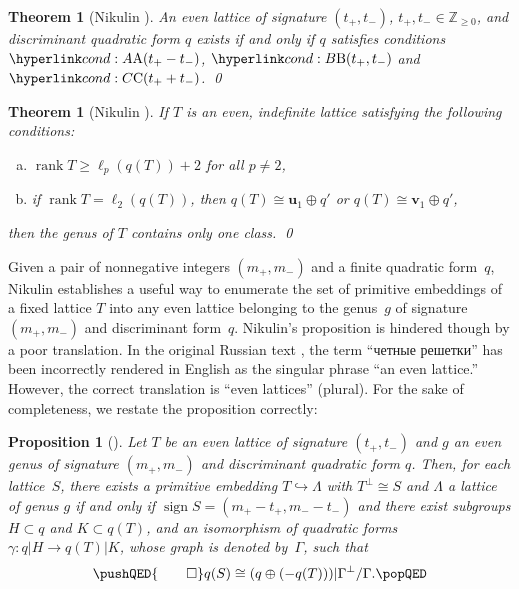 \documentclass[a4paper]{amsart}
\theoremstyle{definition}
\theoremstyle{plain}
\newtheorem{theorem}[definition]{Theorem}
\newtheorem{proposition}[definition]{Proposition}
\DeclareMathOperator{\sign}{sign}
\DeclareMathOperator{\rank}{rank}
\newcommand{\IZ}{\mathbb{Z}}
\newcommand{\bu}{\mathbf{u}}
\newcommand{\bv}{\mathbf{v}}
\begin{document}
\begin{theorem}[Nikulin {\cite[Theorem 1.10.1]{Nikulin:int.sym.bilinear.forms}}] \label{thm:Nikulin-existence}
An even lattice of signature \((t_{+},t_{-})\), \(t_+,t_- \in \IZ_{\geq 0}\), and discriminant quadratic form \(q\) exists 
if and only if \(q\) satisfies conditions \(\condA{t_+ - t_-}\), \(\condB{t_+, t_-}\) and \(\condC{t_+ + t_-}\). \qed
\end{theorem}

\begin{theorem}[Nikulin {\cite[Theorem 1.14.2]{Nikulin:int.sym.bilinear.forms}}] \label{thm:Nikulin-uniqueness}
If \(T\) is an even, indefinite lattice satisfying the following conditions:
\begin{enumerate}[(a)]
 \item \(\rank T \ge \ell_p(q(T)) + 2\) for all \(p \neq 2\),
 \item if \(\rank T = \ell_2(q(T))\), then \(q(T) \cong \bu_1 \oplus q'\) or \(q(T) \cong \bv_1 \oplus q'\),
\end{enumerate}
then the genus of \(T\) contains only one class. \qed
\end{theorem}

Given a pair of nonnegative integers \((m_+, m_-)\) and a finite quadratic form~\(q\), Nikulin establishes a useful way to enumerate the set of primitive embeddings of a fixed lattice \(T\) into any even lattice belonging to the genus~\(g\) of signature \((m_+,m_-)\) and discriminant form~\(q\). 
Nikulin's proposition is hindered though by a poor translation. In the original Russian text \cite{Nikulin:int.sym.bilinear.forms_Russian}, the term ``четные решетки'' has been incorrectly rendered in English as the singular phrase ``an even lattice.'' However, the correct translation is ``even lattices'' (plural). 
For the sake of completeness, we restate the proposition correctly:

\begin{proposition}[{\cite[Proposition 1.15.1]{Nikulin:int.sym.bilinear.forms}}] \label{prop:Nikulin1.15.1}
Let \(T\) be an even lattice of signature \((t_+,t_-)\) and \(g\) an even genus of signature \((m_+,m_-)\) and discriminant quadratic form \(q\). 
Then, for each lattice~\(S\), there exists a primitive embedding \(T \hookrightarrow \Lambda\) with \(T^\perp \cong S\) and \(\Lambda\) a lattice of genus \(g\) if and only if \(\sign S = (m_+ - t_+, m_- - t_-)\) and
there exist subgroups \(H \subset q\) and \(K \subset q(T)\), and an isomorphism of quadratic forms \(\gamma\colon q|H \rightarrow q(T)|K\), whose graph is denoted by~\(\Gamma\), such that 
\[
\pushQED{\qed} 
 q(S) \cong (q \oplus (-q(T))) | \Gamma^\perp/\Gamma. \qedhere
\popQED
\]
\end{proposition}
\end{document}
